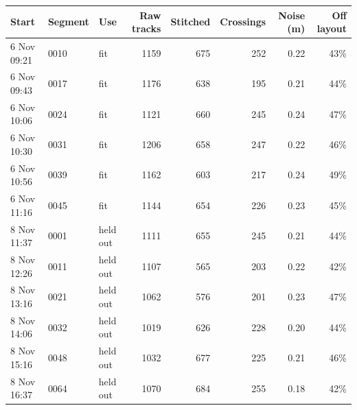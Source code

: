 \begin{tabular}{|l|l|l|r|r|r|r|r|}
\hline
\textbf{Start} & \textbf{Segment} & \textbf{Use} & \textbf{Raw tracks} & \textbf{Stitched} & \textbf{Crossings} & \textbf{Noise (m)} & \textbf{Off layout} \\
\hline
6 Nov 09:21 & 0010 & fit & 1159 & 675 & 252 & 0.22 & 43\% \\
6 Nov 09:43 & 0017 & fit & 1176 & 638 & 195 & 0.21 & 44\% \\
6 Nov 10:06 & 0024 & fit & 1121 & 660 & 245 & 0.24 & 47\% \\
6 Nov 10:30 & 0031 & fit & 1206 & 658 & 247 & 0.22 & 46\% \\
6 Nov 10:56 & 0039 & fit & 1162 & 603 & 217 & 0.24 & 49\% \\
6 Nov 11:16 & 0045 & fit & 1144 & 654 & 226 & 0.23 & 45\% \\
8 Nov 11:37 & 0001 & held out & 1111 & 655 & 245 & 0.21 & 44\% \\
8 Nov 12:26 & 0011 & held out & 1107 & 565 & 203 & 0.22 & 42\% \\
8 Nov 13:16 & 0021 & held out & 1062 & 576 & 201 & 0.23 & 47\% \\
8 Nov 14:06 & 0032 & held out & 1019 & 626 & 228 & 0.20 & 44\% \\
8 Nov 15:16 & 0048 & held out & 1032 & 677 & 225 & 0.21 & 46\% \\
8 Nov 16:37 & 0064 & held out & 1070 & 684 & 255 & 0.18 & 42\% \\
\hline
\end{tabular}
